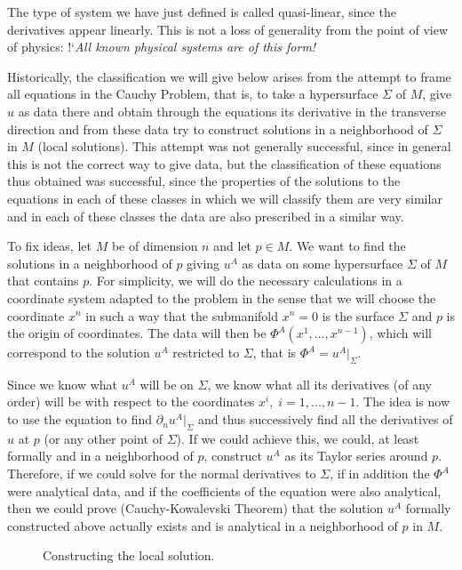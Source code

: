 The type of system we have just defined is called quasi-linear, since the derivatives appear linearly. This is not a loss of generality from the point of view of physics:
\espa
\noi 
{!`\sl All known physical systems are of this form!}
\espa


Historically, the classification we will give below arises from the attempt to frame all equations in the Cauchy Problem, that is, to take a hypersurface $\Sigma$ of $M$, give $u$ as data there and obtain through the equations its derivative in the transverse direction and from these data try to construct solutions in a neighborhood of $\Sigma$ in $M$ (local solutions). This attempt was not generally successful, since in general this is not the correct way to give data, but the classification of these equations thus obtained was successful, since the properties of the solutions to the equations in each of these classes in which we will classify them are very similar and in each of these classes the data are also prescribed in a similar way.

To fix ideas, let $M$ be of dimension $n$ and let $p \in M$.
We want to find the solutions in a neighborhood of $p$ giving $u^A$ as data on some hypersurface $\Sigma$ of $M$ that contains $p$. For simplicity, we will do the necessary calculations in a coordinate system adapted to the problem in the sense that we will choose the coordinate $x^n$ in such a way that the submanifold $x^n =0$ is the surface $\Sigma$ and $p$ is the origin of coordinates. The data will then be $\Phi^A(x^1,...,x^{n-1})$, which will correspond to the solution $u^A$ restricted to $\Sigma$, that is $\Phi^A = u^A|_{\Sigma}$.

Since we know what $u^A$ will be on $\Sigma$, we know what all its derivatives (of any order) will be with respect to the coordinates $x^i,\; i=1,...,n-1$. 
The idea is now to use the equation to find $\partial_n u^A |_{\Sigma}$ and thus successively find all the derivatives of $u$ at $p$ (or any other point of $\Sigma$). If we could achieve this, we could, at least formally and in a neighborhood of $p$, construct $u^A$ as its Taylor series around $p$. Therefore, if we could solve for the normal derivatives to $\Sigma$, if in addition the $\Phi^A$ were analytical data, and if the coefficients of the equation were also analytical, then we could prove (Cauchy-Kowalevski Theorem) that the solution $u^A$ formally constructed above actually exists and is analytical in a neighborhood of $p$ in $M$.

\espa 
\begin{figure}[htbp]
  \begin{center}
    \caption{Constructing the local solution.}
    \label{fig:11_4}
  \end{center}
\end{figure}

